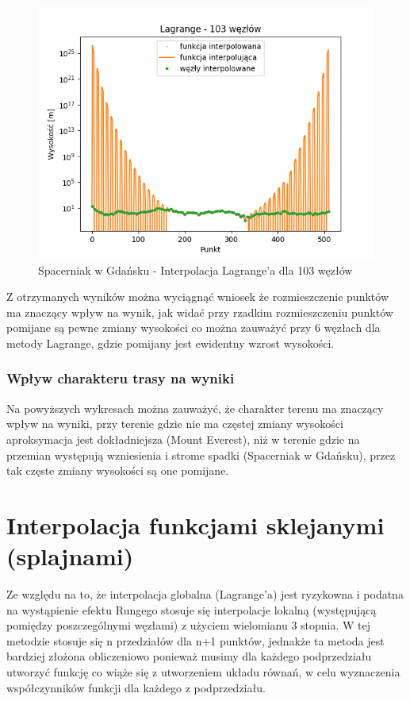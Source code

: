 \documentclass[12pt]{extarticle}
\begin{document}
\begin{figure}[H]
    \centering
    \includegraphics[scale=0.8]{interpolation_SpacerniakGdansk_Lagrange_103.png}
    \caption{Spacerniak w Gdańsku - Interpolacja Lagrange'a dla 103 węzłów}
\end{figure}
Z otrzymanych wyników można wyciągnąć wniosek że rozmieszczenie punktów ma znaczący wpływ na wynik, jak widać przy rzadkim rozmieszczeniu punktów pomijane są pewne zmiany wysokości co można zauważyć przy 6 węzłach dla metody Lagrange, gdzie pomijany jest ewidentny wzrost wysokości.
\subsubsection*{Wpływ charakteru trasy na wyniki}
Na powyższych wykresach można zauważyć, że charakter terenu ma znaczący wpływ na wyniki, przy terenie gdzie nie ma częstej zmiany wysokości aproksymacja jest dokładniejsza (Mount Everest), niż w terenie gdzie na przemian występują wzniesienia i strome spadki (Spacerniak w Gdańsku), przez tak częste zmiany wysokości są one pomijane.

\section*{Interpolacja funkcjami sklejanymi (splajnami)}
Ze względu na to, że interpolacja globalna (Lagrange'a) jest ryzykowna i podatna na wystąpienie efektu Rungego stosuje się interpolacje lokalną (występującą pomiędzy poszczególnymi węzłami) z użyciem wielomianu 3 stopnia. W tej metodzie stosuje się n przedziałów dla n+1 punktów, jednakże ta metoda jest bardziej złożona obliczeniowo ponieważ musimy dla każdego podprzedziału utworzyć funkcję co wiąże się z utworzeniem układu równań, w celu wyznaczenia współczynników funkcji dla każdego z podprzedziału.
\end{document}

